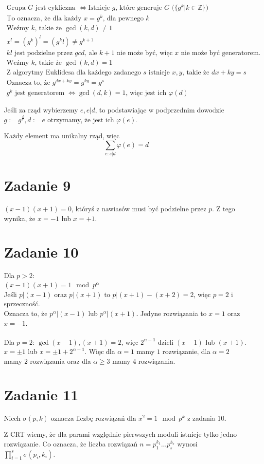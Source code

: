 \documentclass[11pt]{article}
\begin{document}
\begin{align*}
\text{Grupa $G$ jest cykliczna } \Leftrightarrow \text{Istnieje $g$, które generuje $G$ ($\{g^k|k\in\mathbb{Z}\}$)}\\
\text{To oznacza, że dla każdy $x = g^k$, dla pewnego $k$}\\
\text{Weźmy $k$, takie że $\gcd(k, d)\neq1$ }\\
x^l = (g^k)^l = (g^kl) \neq g^{k+1}\\
\text{$kl$ jest podzielne przez $gcd$, ale $k+1$ nie może być, więc $x$ nie może być generatorem.}\\
\text{Weźmy $k$, takie że $\gcd(k, d)=1$}\\
\text{Z algorytmy Euklidesa dla każdego zadanego $s$ istnieje $x,y$, takie że $dx+ky=s$}\\
\text{Oznacza to, że $g^{dx+ky}=g^{ky}=g^s$}\\
\text{$g^k$ jest generatorem $\Leftrightarrow \gcd(d,k)=1$, więc jest ich $\varphi(d)$}
\end{align*}

Jeśli za rząd wybierzemy $e, e|d$, to podstawiając w podprzednim dowodzie $g:=g^{\frac{d}{e}}, d := e$ otrzymamy, że jest ich $\varphi(e)$.

Każdy element ma unikalny rząd, więc
\[
\sum_{e:e|d}\varphi (e) = d
\]

\section*{Zadanie 9}
$(x-1)(x+1)=0$, któryś z nawiasów musi być podzielne przez $p$. Z tego wynika, że $x = -1$ lub $x = +1$.

\section*{Zadanie 10}
Dla $p > 2$: \\
$(x-1)(x+1)=1 \mod p^{\alpha}$\\
Jeśli $p | (x-1)$ oraz $p | (x + 1)$ to $p | (x+1)-(x+2)=2$, więc $p=2$ i sprzeczność.\\
Oznacza to, że $p^\alpha | (x-1)$ lub $p^\alpha | (x+1)$.
Jedyne rozwiązania to $x=1$ oraz $x=-1$.\\
\\
Dla $p = 2$: $\gcd(x-1),(x+1)=2$, więc $2^{\alpha-1}$ dzieli $(x-1)$ lub $(x+1)$. $x = \pm 1$ lub $x = \pm 1 + 2^{\alpha-1}$.
Więc dla $\alpha = 1$ mamy $1$ rozwiązanie, dla $\alpha=2$ mamy $2$ rozwiązania oraz dla $\alpha \ge 3$ mamy 4 rozwiązania.
\section*{Zadanie 11}
Niech $\sigma(p,k)$ oznacza liczbę rozwiązań dla $x^2=1 \mod p^k$ z zadania 10.

Z CRT wiemy, że dla parami względnie pierwszych moduli istnieje tylko jedno rozwiązanie.
Co oznacza, że liczba rozwiązań $n=p_1^{k_1}\ldots p_s^{k_s}$ wynosi $\prod_{i=1}^{s} \sigma(p_i,k_i)$. 
\end{document}
